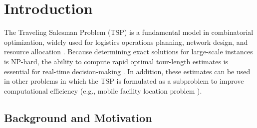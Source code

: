 \documentclass{article}
\begin{document}
\begin{abstract}
\end{abstract}





\onehalfspacing

\section{Introduction}

The Traveling Salesman Problem (TSP) is a fundamental model in combinatorial optimization, widely used for logistics operations planning, network design, and resource allocation \citep{chien1992operational, concorde2006}. Because determining exact solutions for large-scale instances is NP-hard, the ability to compute rapid optimal tour-length estimates is essential for real-time decision-making \citep{heldkarp1962, wscube2024}.
In addition, these estimates can be used in other problems in which the TSP is formulated as a subproblem to improve computational efficiency (e.g., mobile facility location problem \citep{halper2011mobile}).



\subsection{Background and Motivation}
\end{document}

